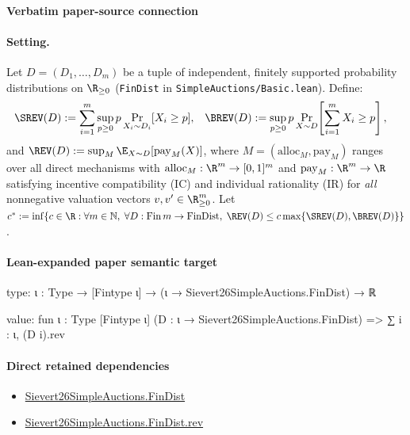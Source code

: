 \documentclass[10pt]{article}
\begin{document}
\paragraph{Verbatim paper-source connection}
\begin{ReviewVerbatim}
\paragraph{Setting.}
Let $D = (D_1, \dots, D_m)$ be a tuple of independent, finitely supported probability distributions on $\R_{\ge 0}$ (\texttt{FinDist} in \texttt{SimpleAuctions/Basic.lean}). Define:
\begin{align*}
  \SREV(D) &:= \sum_{i=1}^m \sup_{p \ge 0} p \Pr_{X_i \sim D_i}[X_i \ge p], &
  \BREV(D) &:= \sup_{p \ge 0} p \Pr_{X \sim D}\!\left[\sum_{i=1}^m X_i \ge p\right],
\end{align*}
and $\REV(D) := \sup_{M} \E_{X \sim D}[\mathrm{pay}_M(X)]$, where $M = (\mathrm{alloc}_M, \mathrm{pay}_M)$ ranges over all direct mechanisms with $\mathrm{alloc}_M : \R^m \to [0,1]^m$ and $\mathrm{pay}_M : \R^m \to \R$ satisfying incentive compatibility (IC) and individual rationality (IR) for \emph{all} nonnegative valuation vectors $v, v' \in \R_{\ge 0}^m$. Let $c^* := \inf\{c \in \R : \forall m \in \mathbb{N},\; \forall D : \mathrm{Fin}\,m \to \mathrm{FinDist},\; \REV(D) \le c \max\{\SREV(D),\BREV(D)\}\}$.
\end{ReviewVerbatim}



\paragraph{Lean-expanded paper semantic target}
\begin{ReviewVerbatim}
type:
{ι : Type} → [Fintype ι] → (ι → Sievert26SimpleAuctions.FinDist) → ℝ

value:
fun {ι : Type} [Fintype ι] (D : ι → Sievert26SimpleAuctions.FinDist) => ∑ i : ι, (D i).rev
\end{ReviewVerbatim}

\paragraph{Direct retained dependencies}
\begin{itemize}\raggedright
\item \hyperlink{paper-prerequisite-5b39ea21863ce14e}{Sievert26\allowbreak{}Simple\allowbreak{}Auctions.\allowbreak{}Fin\allowbreak{}Dist}
\item \hyperlink{governing-declaration-e678f8bf5214cffc}{Sievert26\allowbreak{}Simple\allowbreak{}Auctions.\allowbreak{}Fin\allowbreak{}Dist.\allowbreak{}rev}
\end{itemize}
\end{document}
